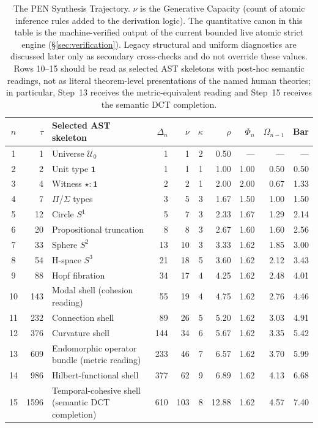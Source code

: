 \documentclass[11pt,a4paper]{article}
\theoremstyle{plain}
\theoremstyle{definition}
\theoremstyle{remark}
\newcommand{\U}{\mathcal{U}}
\begin{document}
\begin{table}[tbp]
\centering
\caption{The PEN Synthesis Trajectory.  $\nu$ is the Generative Capacity (count of atomic inference rules added to the derivation logic).  The quantitative canon in this table is the machine-verified output of the current bounded live atomic strict engine (\S\ref{sec:verification}).  Legacy structural and uniform diagnostics are discussed later only as secondary cross-checks and do not override these values.  Rows 10--15 should be read as selected AST skeletons with post-hoc semantic readings, not as literal theorem-level presentations of the named human theories; in particular, Step~13 receives the metric-equivalent reading and Step~15 receives the semantic DCT completion.}
\label{tab:genesis}
\small
\setlength{\tabcolsep}{3pt}
\begin{tabular}{@{}cr l rrrr rrr@{}}
\toprule
$n$ & $\tau$ & Selected AST skeleton & $\Delta_n$ & $\nu$ & $\kappa$ & $\rho$ & $\Phi_n$ & $\Omega_{n-1}$ & Bar \\
\midrule
1  & 1    & Universe $\U_0$              & 1   & 1   & 2 & 0.50  & ---  & ---  & ---  \\
2  & 2    & Unit type $\mathbf{1}$       & 1   & 1   & 1 & 1.00  & 1.00 & 0.50 & 0.50 \\
3  & 4    & Witness $\star : \mathbf{1}$ & 2   & 2   & 1 & 2.00  & 2.00 & 0.67 & 1.33 \\
4  & 7    & $\Pi$/$\Sigma$ types         & 3   & 5   & 3 & 1.67  & 1.50 & 1.00 & 1.50 \\
\midrule
5  & 12   & Circle $S^1$                 & 5   & 7   & 3 & 2.33  & 1.67 & 1.29 & 2.14 \\
6  & 20   & Propositional truncation     & 8   & 8   & 3 & 2.67  & 1.60 & 1.60 & 2.56 \\
7  & 33   & Sphere $S^2$                 & 13  & 10  & 3 & 3.33  & 1.62 & 1.85 & 3.00 \\
8  & 54   & H-space $S^3$                & 21  & 18  & 5 & 3.60  & 1.62 & 2.12 & 3.43 \\
9  & 88   & Hopf fibration               & 34  & 17  & 4 & 4.25  & 1.62 & 2.48 & 4.01 \\
\midrule
10 & 143  & Modal shell (cohesion reading)              & 55  & 19  & 4 & 4.75  & 1.62 & 2.76 & 4.46 \\
11 & 232  & Connection shell                            & 89  & 26  & 5 & 5.20  & 1.62 & 3.03 & 4.91 \\
12 & 376  & Curvature shell                             & 144 & 34  & 6 & 5.67  & 1.62 & 3.35 & 5.42 \\
13 & 609  & Endomorphic operator bundle (metric reading) & 233 & 46  & 7 & 6.57  & 1.62 & 3.70 & 5.99 \\
14 & 986  & Hilbert-functional shell                    & 377 & 62  & 9 & 6.89  & 1.62 & 4.13 & 6.68 \\
\midrule
15 & 1596 & Temporal-cohesive shell (semantic DCT completion) & 610 & 103 & 8 & 12.88 & 1.62 & 4.57 & 7.40 \\
\bottomrule
\end{tabular}
\end{table}
\end{document}
